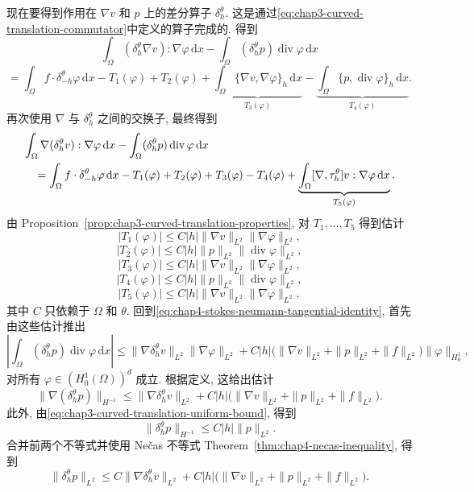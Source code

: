 \begin{Proof}
现在要得到作用在 $\nabla v$ 和 $p$ 上的差分算子 $\delta_h^\theta$. 这是通过\eqref{eq:chap3-curved-translation-commutator}中定义的算子完成的. 得到
\[
 \int_\Omega(\delta_h^\theta\nabla v):\nabla\varphi\,\mathrm dx
 -\int_\Omega(\delta_h^\theta p)\operatorname{div}\varphi\,\mathrm dx
\]
\[
 =\int_\Omega f\cdot\delta_{-h}^\theta\varphi\,\mathrm dx
 -T_1(\varphi)+T_2(\varphi)
 +\underbrace{\int_\Omega\{\nabla v,\nabla\varphi\}_h\,\mathrm dx}_{T_3(\varphi)}
 -\underbrace{\int_\Omega\{p,\operatorname{div}\varphi\}_h\,\mathrm dx}_{T_4(\varphi)}.
\]
再次使用 $\nabla$ 与 $\delta_h^\theta$ 之间的交换子, 最终得到
\begin{align}
 &\int_\Omega\nabla(\delta_h^\theta v):\nabla\varphi\,\mathrm dx
 -\int_\Omega(\delta_h^\theta p)\operatorname{div}\varphi\,\mathrm dx\notag\\
 &\quad=\int_\Omega f\cdot\delta_{-h}^\theta\varphi\,\mathrm dx
 -T_1(\varphi)+T_2(\varphi)+T_3(\varphi)-T_4(\varphi)
 +\underbrace{\int_\Omega[\nabla,\tau_h^\theta]v:\nabla\varphi\,\mathrm dx}_{T_5(\varphi)}.
 \label{eq:chap4-stokes-neumann-tangential-identity}
\end{align}
由 Proposition~\ref{prop:chap3-curved-translation-properties}, 对 $T_1,\ldots,T_5$ 得到估计
\[
 |T_1(\varphi)|\leq C|h|\|\nabla v\|_{L^2}\|\nabla\varphi\|_{L^2},
\]
\[
 |T_2(\varphi)|\leq C|h|\|p\|_{L^2}\|\operatorname{div}\varphi\|_{L^2},
\]
\[
 |T_3(\varphi)|\leq C|h|\|\nabla v\|_{L^2}\|\nabla\varphi\|_{L^2},
\]
\[
 |T_4(\varphi)|\leq C|h|\|p\|_{L^2}\|\operatorname{div}\varphi\|_{L^2},
\]
\[
 |T_5(\varphi)|\leq C|h|\|\nabla v\|_{L^2}\|\nabla\varphi\|_{L^2},
\]
其中 $C$ 只依赖于 $\Omega$ 和 $\theta$. 回到\eqref{eq:chap4-stokes-neumann-tangential-identity}, 首先由这些估计推出
\[
 \left|\int_\Omega(\delta_h^\theta p)\operatorname{div}\varphi\,\mathrm dx\right|
 \leq\|\nabla\delta_h^\theta v\|_{L^2}\|\nabla\varphi\|_{L^2}
 +C|h|\bigl(\|\nabla v\|_{L^2}+\|p\|_{L^2}+\|f\|_{L^2}\bigr)
 \|\varphi\|_{H_0^1},
\]
对所有 $\varphi\in(H_0^1(\Omega))^d$ 成立. 根据定义, 这给出估计
\[
 \|\nabla(\delta_h^\theta p)\|_{H^{-1}}
 \leq\|\nabla\delta_h^\theta v\|_{L^2}
 +C|h|\bigl(\|\nabla v\|_{L^2}+\|p\|_{L^2}+\|f\|_{L^2}\bigr).
\]
此外, 由\eqref{eq:chap3-curved-translation-uniform-bound}, 得到
\[
 \|\delta_h^\theta p\|_{H^{-1}}\leq C|h|\|p\|_{L^2}.
\]
合并前两个不等式并使用 Nečas 不等式 Theorem~\ref{thm:chap4-necas-inequality}, 得到
\begin{equation}
 \|\delta_h^\theta p\|_{L^2}
 \leq C\|\nabla\delta_h^\theta v\|_{L^2}
 +C|h|\bigl(\|\nabla v\|_{L^2}+\|p\|_{L^2}+\|f\|_{L^2}\bigr).
 \label{eq:chap4-stokes-neumann-tangential-pressure}
\end{equation}


\end{Proof}

